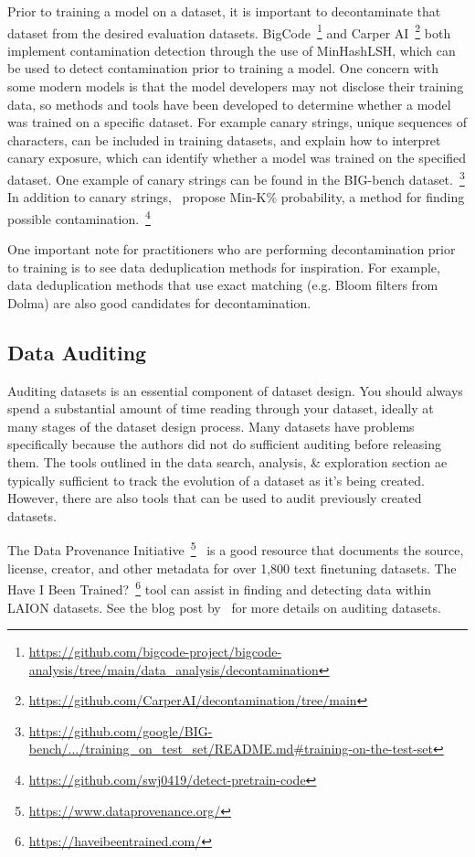 Prior to training a model on a dataset, it is important to decontaminate that dataset from the desired evaluation datasets.
BigCode~\footnote{\url{https://github.com/bigcode-project/bigcode-analysis/tree/main/data_analysis/decontamination}} and Carper AI~\footnote{\url{https://github.com/CarperAI/decontamination/tree/main}} both implement contamination detection through the use of MinHashLSH, which can be used to detect contamination prior to training a model.
One concern with some modern models is that the model developers may not disclose their training data, so methods and tools have been developed to determine whether a model was trained on a specific dataset. For example canary strings, unique sequences of characters, can be included in training datasets, and \citet{jagielski2023note} explain how to interpret canary exposure, which can identify whether a model was trained on the specified dataset. One example of canary strings can be found in the BIG-bench dataset.~\footnote{\href{https://github.com/google/BIG-bench/blob/main/bigbench/benchmark_tasks/training_on_test_set/README.md\#training-on-the-test-set}{https://github.com/google/BIG-bench/.../training\_on\_test\_set/README.md\#training-on-the-test-set}}
In addition to canary strings,~\citet{shi2023detecting} propose Min-K\% probability, a method for finding possible contamination.~\footnote{\url{https://github.com/swj0419/detect-pretrain-code}}

One important note for practitioners who are performing decontamination prior to training is to see data deduplication methods for inspiration. For example, data deduplication methods that use exact matching (e.g. Bloom filters from Dolma) are also good candidates for decontamination.

\subsection{Data Auditing}
Auditing datasets is an essential component of dataset design. You should always spend a substantial amount of time reading through your dataset, ideally at many stages of the dataset design process. Many datasets have problems specifically because the authors did not do sufficient auditing before releasing them.
The tools outlined in the data search, analysis, \& exploration section ae typically sufficient to track the evolution of a dataset as it's being created. However, there are also tools that can be used to audit previously created datasets.

The Data Provenance Initiative~\footnote{\url{https://www.dataprovenance.org/}}~\citep{longpre2023data} is a good resource that documents the source, license, creator, and other metadata for over 1,800 text finetuning datasets. The Have I Been Trained?~\footnote{\url{https://haveibeentrained.com/}} tool can assist in finding and detecting data within LAION datasets. See the blog post by~\citet{HuggingFaceCommunityBlog} for more details on auditing datasets.


